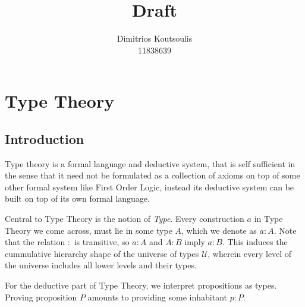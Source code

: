 \documentclass[12pt]{article}
\begin{document}
 
\title{Draft}%
\author{Dimitrios Koutsoulis\\ %
11838639} %
 
\maketitle
\section{Type Theory}
\subsection{Introduction}
Type theory is a formal language and deductive system, that is self sufficient in the sense that it need not be formulated as a collection of axioms on top of some other formal system like First Order Logic, instead its deductive system can be built on top of its own formal language. 

Central to Type Theory is the notion of \textit{Type}. Every construction $a$ in Type Theory we come across, must lie in some type $A$, which we denote as $a : A$. Note that the relation $:$ is transitive, so $a : A$ and $A : B$ imply $a : B$. 
This induces the cummulative hierarchy shape of the universe of types $\mathcal{U}$, wherein every level of the universe includes all lower levels and their types.

For the deductive part of Type Theory, we interpret propositions as types. Proving proposition $P$ amounts to providing some inhabitant $p : P$. 
\end{document}
